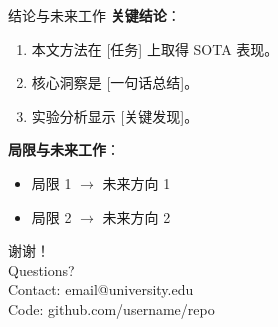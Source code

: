 \documentclass[aspectratio=169,11pt]{beamer}
\begin{document}
\begin{frame}{结论与未来工作}
  \textbf{关键结论}：
  \begin{enumerate}
    \item 本文方法在 [任务] 上取得 SOTA 表现。
    \item 核心洞察是 [一句话总结]。
    \item 实验分析显示 [关键发现]。
  \end{enumerate}
  \vspace{0.5em}
  \textbf{局限与未来工作}：
  \begin{itemize}
    \item 局限 1 $\rightarrow$ 未来方向 1
    \item 局限 2 $\rightarrow$ 未来方向 2
  \end{itemize}
\end{frame}

\begin{frame}[standout]
  谢谢！\\[1em]
  \normalsize Questions?\\[0.5em]
  \footnotesize Contact: email@university.edu\\
  Code: github.com/username/repo
\end{frame}
\end{document}
